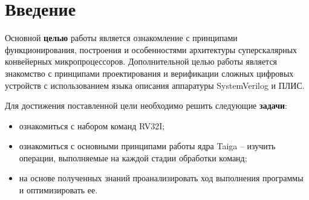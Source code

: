 \section*{Введение}
{}
Основной \textbf{целью} работы является ознакомление с принципами функционирования, построения и особенностями архитектуры суперскалярных конвейерных микропроцессоров. Дополнительной целью работы является знакомство с принципами проектирования и верификации сложных цифровых устройств с использованием языка описания аппаратуры SystemVerilog и ПЛИС.

Для достижения поставленной цели необходимо решить следующие \textbf{задачи}:

\begin{itemize}
	\item ознакомиться с набором команд RV32I;
	\item ознакомиться с основными принципами работы ядра Taiga -- изучить операции, выполняемые на каждой стадии обработки команд;
	\item на основе полученных знаний проанализировать ход выполнения программы и оптимизировать ее.
\end{itemize}

\newpage